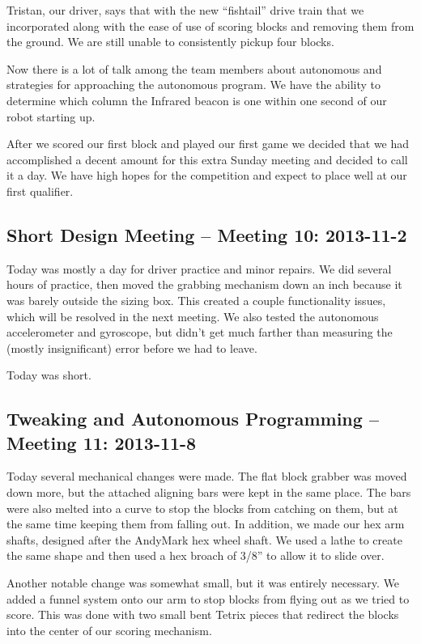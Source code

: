 Tristan, our driver, says that with the new ``fishtail'' drive train that we incorporated along with the ease of use of scoring blocks and removing them from the ground. We are still unable to consistently pickup four blocks. 

Now there is a lot of talk among the team members about autonomous and strategies for approaching the autonomous program. We have the ability to determine which column the Infrared beacon is one within one second of our robot starting up.

After we scored our first block and played our first game we decided that we had accomplished a decent amount for this extra Sunday meeting and decided to call it a day. We have high hopes for the competition and expect to place well at our first qualifier. 

\newpage \subsection{Short Design Meeting -- Meeting 10: 2013-11-2}
Today was mostly a day for driver practice and minor repairs. We did several hours of practice, then moved the grabbing mechanism down an inch because it was barely outside the sizing box. This created a couple functionality issues, which will be resolved in the next meeting. We also tested the autonomous accelerometer and gyroscope, but didn't get much farther than measuring the (mostly insignificant) error before we had to leave. 

Today was short.

\newpage \subsection{Tweaking and Autonomous Programming -- Meeting 11: 2013-11-8}
Today several mechanical changes were made. The flat block grabber was moved down more, but the attached aligning bars were kept in the same place. The bars were also melted into a curve to stop the blocks from catching on them, but at the same time keeping them from falling out. In addition, we made our hex arm shafts, designed after the AndyMark hex wheel shaft. We used a lathe to create the same shape and then used a hex broach of 3/8'' to allow it to slide over. 

Another notable change was somewhat small, but it was entirely necessary. We added a funnel system onto our arm to stop blocks from flying out as we tried to score. This was done with two small bent Tetrix pieces that redirect the blocks into the center of our scoring mechanism. 

